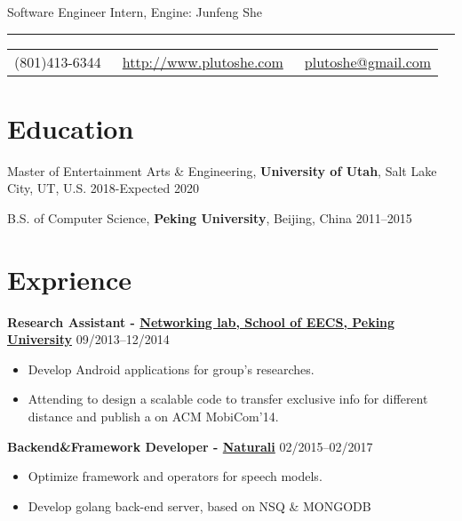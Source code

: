 \documentclass{article}
\begin{document}
	
	\color{text1} %
	
	\par{\centering
		{\sffamily\huge Software Engineer Intern, Engine: Junfeng She
		}\\	
		{\color{headings} \par}
		{\color{white} \hrule} %
		
		\vspace{10pt}
		
		\colorbox{mygrey}{\textcolor{text1}{
				\begin{tabular}{c|c|c}
					\raisebox{-2pt}{\Phone} (801)413-6344 &
					\raisebox{-2pt}{\Envelope} ~\href{http://www.plutoshe.com}{http://www.plutoshe.com}	 &	 \raisebox{0pt}{\textbf{@}}
					~\href{mailto:plutoshe@gmail.com}{plutoshe@gmail.com}
				\end{tabular}
			}
		}
		\vspace{10pt}
		
		\section{Education}
		\vspace{5pt}
		Master of Entertainment Arts \& Engineering, \textbf{University of Utah}, Salt Lake City, UT, U.S. \hfill 2018-Expected 2020
		\vspace{5pt}
		
		B.S. of Computer Science, \textbf{Peking University}, Beijing, China \hfill 2011--2015
		\vspace{10pt}
		
		\section{Exprience}
		\textbf{Research Assistant - \href{http://net.pku.edu.cn/mobile/doku.php?id=eng:start}{Networking lab, School of EECS, Peking University}} \hfill 09/2013--12/2014
			\begin{itemize}
				\item Develop Android applications for group's researches.
				\item Attending to design a scalable code to transfer exclusive info for different distance and publish a  on ACM MobiCom'14.
			\end{itemize}
		\textbf{Backend\&Framework Developer - \href{https://naturali.io}{Naturali}} \hfill 02/2015--02/2017
		\begin{itemize}
			\item Optimize framework and operators for speech models.
			\item Develop golang back-end server, based on NSQ \& MONGODB
		\end{itemize}
		
}
\end{document}
